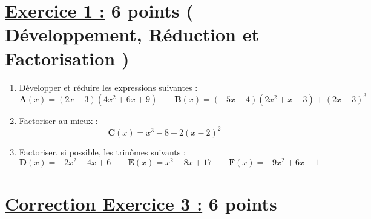 \documentclass[12pt,a4paper]{article}
\begin{document}
\renewcommand{\arraystretch}{1.5}
\renewcommand{\arrayrulewidth}{1.2pt}
\vspace{3cm}

\section*{\underline{Exercice 1 :} 6 points ( Développement, Réduction et Factorisation )}
\begin{enumerate}
\item Développer et réduire les expressions suivantes :
\[
\textbf{A}(x) = (2x - 3)(4x^2 + 6x + 9) \quad\quad \textbf{B}(x) = (-5x - 4)(2x^2 + x - 3) + (2x - 3)^3
\]
\item Factoriser au mieux :
\[
\textbf{C}(x) = x^3 - 8 + 2(x - 2)^2 
\]
\item Factoriser, si possible, les trinômes suivants :
\[
\textbf{D}(x) = -2x^2 + 4x + 6\quad\quad \textbf{E}(x) = x^2 - 8x + 17 \quad\quad \textbf{F}(x) = -9x^2 + 6x - 1 
\]

\end{enumerate}

\section*{\underline{Correction Exercice 3 :} 6 points}
\end{document}

